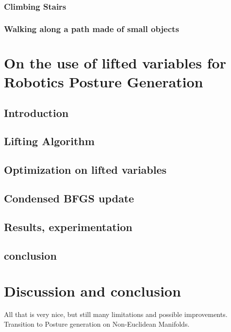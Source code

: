 \subsubsection{Climbing Stairs}
\subsubsection{Walking along a path made of small objects}


\section{On the use of lifted variables for Robotics Posture Generation}
\label{sec:liftedVariables}

\subsection{Introduction}
\label{subsec:Introduction}

\subsection{Lifting Algorithm}
\label{subsec:LiftingAlgorithm}

\subsection{Optimization on lifted variables}
\label{subsec:Optimization on lifted variables}

\subsection{Condensed BFGS update}
\label{subsec:Condensed BFGS update}

\subsection{Results, experimentation}
\label{subsec:Results}

\subsection{conclusion}
\label{subsec:conclusion}


\section{Discussion and conclusion}
All that is very nice, but still many limitations and possible improvements.
Transition to Posture generation on Non-Euclidean Manifolds.
